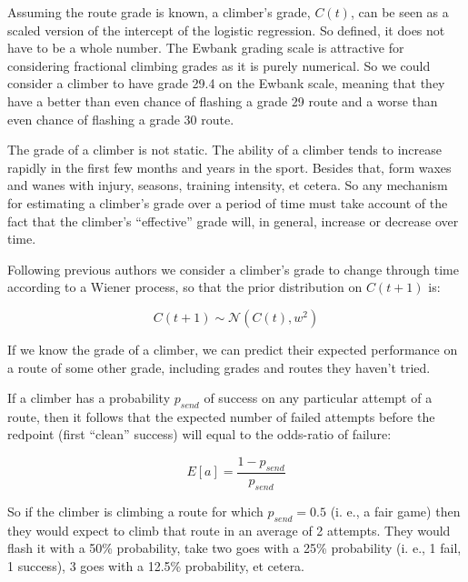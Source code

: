 \documentclass{article}
\begin{document}
{Assuming the route grade is known, a climber's grade, $C(t)$, can be seen as a scaled version of the intercept of the logistic regression. So defined, it does not have to be a whole number. The Ewbank grading scale is attractive for considering fractional climbing grades as it is purely numerical. So we could consider a climber to have grade 29.4 on the Ewbank scale, meaning that they have a better than even chance of flashing a grade 29 route and a worse than even chance of flashing a grade 30 route.

The grade of a climber is not static. The ability of a climber tends to increase rapidly in the first few months and years in the sport. Besides that, form waxes and wanes with injury, seasons, training intensity, et cetera. So any mechanism for estimating a climber's grade over a period of time must take account of the fact that the climber's ``effective'' grade will, in general, increase or decrease over time.

Following previous authors  \cite{coulom2008whole,scarff2020estimation} we consider a climber's grade to change through time according to a Wiener process, so that the prior distribution on $C(t+1)$ is:

\begin{equation}
C(t+1) \sim \mathcal{N}(C(t), w^2)  
\end{equation}

If we know the grade of a climber, we can predict their expected performance on a route of some other grade, including grades and routes they haven't tried. 


If a climber has a probability $p_{send}$ of success on any particular attempt of a route, then it follows that the expected number of failed attempts before the redpoint (first ``clean'' success) will equal to the odds-ratio of failure:

\begin{equation}
 E\left[a\right]=\frac{1-p_{send}}{p_{send}}
 \end{equation} 
 
 So if the climber is climbing a route for which $p_{send}=0.5$ (i. e., a fair game) then they would expect to climb that route in an average of 2 attempts. They would flash it with a 50\% probability, take two goes with a 25\% probability (i. e., 1 fail, 1 success), 3 goes with a 12.5\% probability, et cetera.

}
\end{document}
